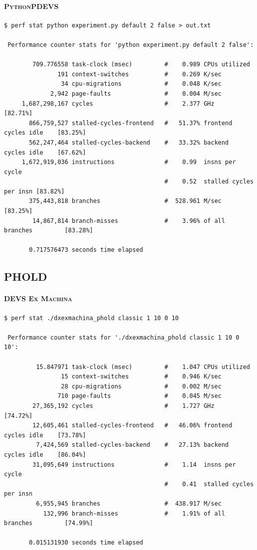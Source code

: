 \documentclass[8pt,a4paper]{report}
\begin{document}
\paragraph{\textsc{PythonPDEVS}}
\begin{Verbatim}[fontsize=\small]
$ perf stat python experiment.py default 2 false > out.txt

 Performance counter stats for 'python experiment.py default 2 false':

        709.776558 task-clock (msec)         #    0.989 CPUs utilized          
               191 context-switches          #    0.269 K/sec                  
                34 cpu-migrations            #    0.048 K/sec                  
             2,942 page-faults               #    0.004 M/sec                  
     1,687,298,167 cycles                    #    2.377 GHz                     [82.71%]
       866,759,527 stalled-cycles-frontend   #   51.37% frontend cycles idle    [83.25%]
       562,247,464 stalled-cycles-backend    #   33.32% backend  cycles idle    [67.62%]
     1,672,919,036 instructions              #    0.99  insns per cycle        
                                             #    0.52  stalled cycles per insn [83.82%]
       375,443,818 branches                  #  528.961 M/sec                   [83.25%]
        14,867,814 branch-misses             #    3.96% of all branches         [83.28%]

       0.717576473 seconds time elapsed
\end{Verbatim}
\subsection{PHOLD}
\paragraph{\textsc{DEVS Ex Machina}}
\begin{Verbatim}[fontsize=\small]
$ perf stat ./dxexmachina_phold classic 1 10 0 10

 Performance counter stats for './dxexmachina_phold classic 1 10 0 10':

         15.847971 task-clock (msec)         #    1.047 CPUs utilized          
                15 context-switches          #    0.946 K/sec                  
                28 cpu-migrations            #    0.002 M/sec                  
               710 page-faults               #    0.045 M/sec                  
        27,365,192 cycles                    #    1.727 GHz                     [74.72%]
        12,605,461 stalled-cycles-frontend   #   46.06% frontend cycles idle    [73.78%]
         7,424,569 stalled-cycles-backend    #   27.13% backend  cycles idle    [86.04%]
        31,095,649 instructions              #    1.14  insns per cycle        
                                             #    0.41  stalled cycles per insn
         6,955,945 branches                  #  438.917 M/sec                  
           132,996 branch-misses             #    1.91% of all branches         [74.99%]

       0.015131930 seconds time elapsed
\end{Verbatim}
\end{document}

